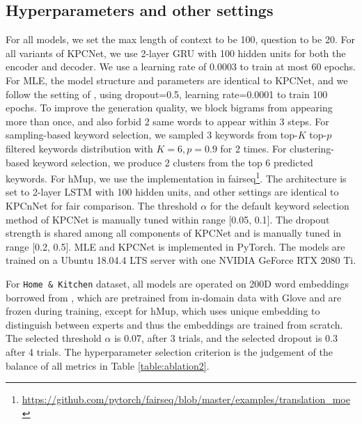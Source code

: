 \documentclass[11pt,a4paper]{article}
\begin{document}
\subsection{Hyperparameters and other settings}
For all models, we set the max length of context to be 100, question to be 20. For all variants of KPCNet, we use 2-layer GRU \citep{cho2014learning} with 100 hidden units for both the encoder and decoder. We use a learning rate of 0.0003 to train at most 60 epochs. For MLE, the model structure and parameters are identical to KPCNet, and we follow the setting of \citet{rao2019answer}, using dropout=0.5, learning rate=0.0001 to train 100 epochs. To improve the generation quality, we block bigrams from appearing more than once, and also forbid 2 same words to appear within 3 steps. For sampling-based keyword selection, we sampled 3 keywords from top-$K$ top-$p$ filtered keywords distribution with $K=6, p=0.9$ for 2 times. For clustering-based keyword selection, we produce 2 clusters from the top 6 predicted keywords. For hMup, we use the implementation in fairseq\footnote{\url{https://github.com/pytorch/fairseq/blob/master/examples/translation_moe}}. The architecture is set to 2-layer LSTM \citep{hochreiter1997long} with 100 hidden units, and other settings are identical to KPCnNet for fair comparison. The threshold $\alpha$ for the default keyword selection method of KPCNet is manually tuned within range [0.05, 0.1]. The dropout strength is shared among all components of KPCNet and is manually tuned in range [0.2, 0.5]. MLE and KPCNet is implemented in PyTorch. The models are trained on a Ubuntu 18.04.4 LTS server with one NVIDIA GeForce RTX 2080 Ti. 

For \texttt{Home \& Kitchen} dataset, all models are operated on 200D word embeddings borrowed from \citet{rao2019answer}, which are pretrained from in-domain data with Glove \citep{pennington2014glove} and are frozen during training, except for hMup, which uses unique embedding to distinguish between experts and thus the embeddings are trained from scratch. The selected threshold $\alpha$ is 0.07, after 3 trials, and the selected dropout is 0.3 after 4 trials. The hyperparameter selection criterion is the judgement of the balance of all metrics in Table \ref{table:ablation2}.
\end{document}
